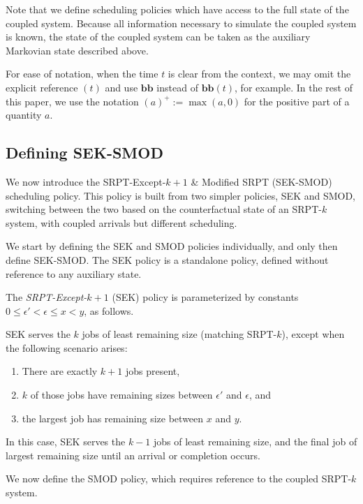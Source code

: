 \documentclass[acmsmall]{acmart}
\newcommand{\bb}{\boldsymbol{b}}
\newcommand{\bbb}{\bb\bb}
\begin{document}
Note that we define scheduling policies which have access to the full state of the coupled system. Because all information necessary to simulate the coupled system is known, the state of the coupled system can be taken as the auxiliary Markovian state described above.

For ease of notation, when the time $t$ is clear from the context, we may omit the explicit reference $(t)$ and use $\bbb$ instead of $\bbb(t)$, for example. In the rest of this paper, we use the notation $(a)^+:=\max(a,0)$ for the positive part of a quantity $a$.

\subsection{Defining SEK-SMOD}
\label{sec:def-sek-smod}

We now introduce the SRPT-Except-$k+1$ \& Modified SRPT (SEK-SMOD) scheduling policy. This policy is built from two simpler policies, SEK and SMOD, switching between the two based on the counterfactual state of an SRPT-$k$ system, with coupled arrivals but different scheduling.

We start by defining the SEK and SMOD policies individually, and only then define SEK-SMOD. The SEK policy is a standalone policy, defined without reference to any auxiliary state.

\begin{definition}
    \label{def:sek}
    The \textit{SRPT-Except-$k+1$} (SEK) policy 
    is parameterized by constants $0 \le \epsilon' < \epsilon \le x < y$, as follows.

    SEK serves the $k$ jobs of least remaining size (matching SRPT-$k$), except when the following scenario arises:
    \begin{enumerate}
        \item There are exactly $k+1$ jobs present,
        \item $k$ of those jobs have remaining sizes between $\epsilon'$ and $\epsilon$, and
        \item the largest job has remaining size between $x$ and $y$.
    \end{enumerate}
    In this case, SEK serves the $k-1$ jobs of least remaining size, and the final job of largest remaining size until an arrival or completion occurs.
\end{definition}

We now define the SMOD policy, which requires reference to the coupled SRPT-$k$ system.
\end{document}
